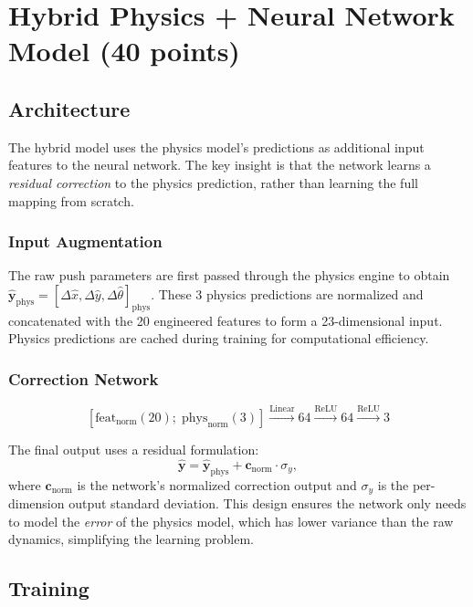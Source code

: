 \documentclass[a4paper]{article}
\begin{document}
\section{Hybrid Physics + Neural Network Model (40 points)}

\subsection{Architecture}

The hybrid model uses the physics model's predictions as additional input features to the neural network. The key insight is that the network learns a \textit{residual correction} to the physics prediction, rather than learning the full mapping from scratch.

\subsubsection{Input Augmentation}

The raw push parameters are first passed through the physics engine to obtain $\hat{\mathbf{y}}_{\text{phys}} = [\Delta\hat{x}, \Delta\hat{y}, \Delta\hat{\theta}]_{\text{phys}}$. These 3 physics predictions are normalized and concatenated with the 20 engineered features to form a 23-dimensional input. Physics predictions are cached during training for computational efficiency.

\subsubsection{Correction Network}

\[
    [\text{feat}_{\text{norm}}(20);\; \text{phys}_{\text{norm}}(3)] \xrightarrow{\text{Linear}} 64 \xrightarrow{\text{ReLU}} 64 \xrightarrow{\text{ReLU}} 3
\]

The final output uses a residual formulation:
\begin{equation}
    \hat{\mathbf{y}} = \hat{\mathbf{y}}_{\text{phys}} + \mathbf{c}_{\text{norm}} \cdot \sigma_y,
\end{equation}
where $\mathbf{c}_{\text{norm}}$ is the network's normalized correction output and $\sigma_y$ is the per-dimension output standard deviation. This design ensures the network only needs to model the \textit{error} of the physics model, which has lower variance than the raw dynamics, simplifying the learning problem.

\subsection{Training}
\end{document}

